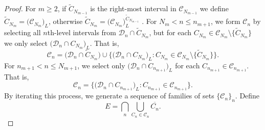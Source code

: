 \documentclass[12pt]{article}
\newcommand{\1}{{\bf 1}}
\begin{document}
\begin{proof}
For $m\geq2$, if $\widetilde{C}_{N_{m-1}}$ is the right-most interval in $\mathcal{C}_{N_{m-1}}$ we define $\widetilde{C}_{N_{m}}=\big(\mathcal{C}_{N_{m}}\big)_L$, otherwise    
$\widetilde{C}_{N_{m}}=\big(\mathcal{C}_{N_{m}}\big)_L^{\widetilde{C}_{N_{m-1}}}$	.	
For $N_{m}<n\leq n_{m+1}$, we form $\mathcal{C}_{n}$ by selecting all  $n$th-level intervals from $\mathcal{D}_n\cap \widetilde{C}_{N_m}$, but for each $C_{N_m}\in\mathcal{C}_{N_m}\setminus  \{\widetilde{C}_{N_m}\} $ we only  select $\Big(\mathcal{D}_n\cap {C}_{N_m}\Big)_L$. 
		That is,
		\begin{equation*}
			\mathcal{C}_{n}=\Big(\mathcal{D}_{n}\cap \widetilde{C}_{N_m}\Big)\cup\Big\{\Big(\mathcal{D}_{n}\cap {C}_{N_m}\Big)_L:{C}_{N_m}\in\mathcal{C}_{N_m}\setminus \{\widetilde{C}_{N_m}\}\Big\}.
		\end{equation*}	
			For $n_{m+1}<n\leq N_{m+1}$, we  select only $\big(\mathcal{D}_n\cap {C}_{n_{m+1}}\big)_L$ for each $C_{n_{m+1}}\in \mathcal{C}_{n_{m+1}}$.
		That is,
		\begin{equation*}
			\mathcal{C}_{n}=\Big\{\big(\mathcal{D}_{n}\cap {C}_{n_{m+1}}\big)_L:{C}_{n_{m+1}}\in\mathcal{C}_{n_{m+1}}\Big\}.
		\end{equation*}	
		By iterating this process, we generate a sequence of  families of sets $\{\mathcal{C}_{n}\}_n$. Define $$E=\bigcap_{n}\bigcup_{C_n\in\mathcal{C}_{n}} \overline{C_n}.$$
		

\end{proof}
\end{document}
